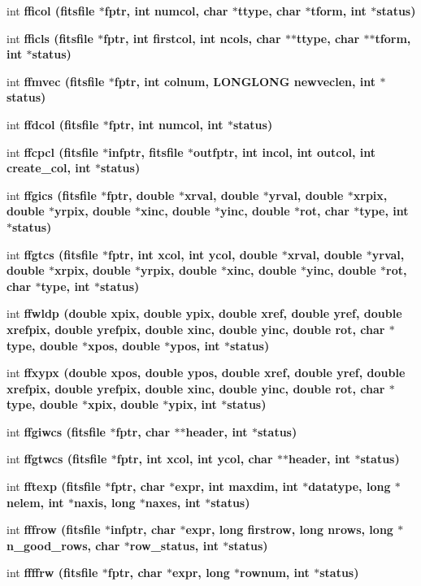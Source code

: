 \begin{CompactItemize}
int \bf{fficol} (\bf{fitsfile} $\ast$fptr, int numcol, char $\ast$ttype, char $\ast$tform, int $\ast$status)
\item 
int \bf{fficls} (\bf{fitsfile} $\ast$fptr, int firstcol, int ncols, char $\ast$$\ast$ttype, char $\ast$$\ast$tform, int $\ast$status)
\item 
int \bf{ffmvec} (\bf{fitsfile} $\ast$fptr, int colnum, \bf{LONGLONG} newveclen, int $\ast$status)
\item 
int \bf{ffdcol} (\bf{fitsfile} $\ast$fptr, int numcol, int $\ast$status)
\item 
int \bf{ffcpcl} (\bf{fitsfile} $\ast$infptr, \bf{fitsfile} $\ast$outfptr, int incol, int outcol, int create\_\-col, int $\ast$status)
\item 
int \bf{ffgics} (\bf{fitsfile} $\ast$fptr, double $\ast$xrval, double $\ast$yrval, double $\ast$xrpix, double $\ast$yrpix, double $\ast$xinc, double $\ast$yinc, double $\ast$rot, char $\ast$type, int $\ast$status)
\item 
int \bf{ffgtcs} (\bf{fitsfile} $\ast$fptr, int xcol, int ycol, double $\ast$xrval, double $\ast$yrval, double $\ast$xrpix, double $\ast$yrpix, double $\ast$xinc, double $\ast$yinc, double $\ast$rot, char $\ast$type, int $\ast$status)
\item 
int \bf{ffwldp} (double xpix, double ypix, double xref, double yref, double xrefpix, double yrefpix, double xinc, double yinc, double rot, char $\ast$type, double $\ast$xpos, double $\ast$ypos, int $\ast$status)
\item 
int \bf{ffxypx} (double xpos, double ypos, double xref, double yref, double xrefpix, double yrefpix, double xinc, double yinc, double rot, char $\ast$type, double $\ast$xpix, double $\ast$ypix, int $\ast$status)
\item 
int \bf{ffgiwcs} (\bf{fitsfile} $\ast$fptr, char $\ast$$\ast$header, int $\ast$status)
\item 
int \bf{ffgtwcs} (\bf{fitsfile} $\ast$fptr, int xcol, int ycol, char $\ast$$\ast$header, int $\ast$status)
\item 
int \bf{fftexp} (\bf{fitsfile} $\ast$fptr, char $\ast$expr, int maxdim, int $\ast$\bf{datatype}, long $\ast$nelem, int $\ast$naxis, long $\ast$naxes, int $\ast$status)
\item 
int \bf{fffrow} (\bf{fitsfile} $\ast$infptr, char $\ast$expr, long firstrow, long nrows, long $\ast$n\_\-good\_\-rows, char $\ast$row\_\-status, int $\ast$status)
\item 
int \bf{ffffrw} (\bf{fitsfile} $\ast$fptr, char $\ast$expr, long $\ast$rownum, int $\ast$status)

\end{CompactItemize}
